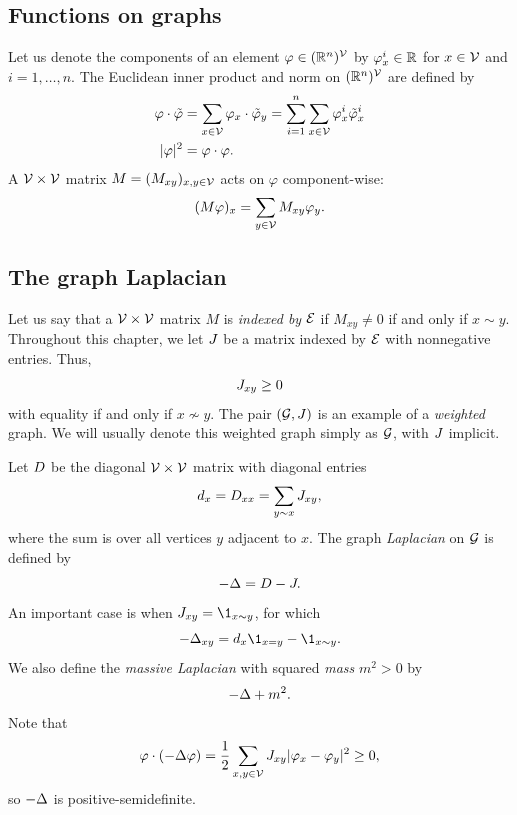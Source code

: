 \subsection{Functions on graphs}

Let us denote the components of an element $\varphi \in ({\mathbb R}^n)^{\mathcal{V}}$ by
$\varphi^i_x \in {\mathbb R}$ for $x \in \mathcal{V}$ and $i = 1, \ldots, n$.
The Euclidean inner product and norm on $({\mathbb R}^n)^{\mathcal{V}}$
are defined by
\begin{align}
\varphi\cdot\tilde\varphi
	&= \sum_{x\in\mathcal{V}} \varphi_x \cdot \tilde\varphi_y
  		= \sum_{i=1}^n \sum_{x\in\mathcal{V}} \varphi^i_x \tilde\varphi^i_x \\
|\varphi|^2
	&= \varphi \cdot \varphi.
\end{align}
A $\mathcal{V}\times\mathcal{V}$ matrix $M = (M_{xy})_{x,y\in\mathcal{V}}$ acts on $\varphi$
component-wise:
\begin{equation}
(M \varphi)_x = \sum_{y\in\mathcal{V}} M_{xy} \varphi_y.
\end{equation}


\subsection{The graph Laplacian}

Let us say that a $\mathcal{V}\times\mathcal{V}$ matrix $M$ is \emph{indexed by} $\mathcal{E}$
if $M_{xy} \ne 0$ if and only if $x \sim y$.
Throughout this chapter, we let $J$ be a matrix indexed by $\mathcal{E}$ with nonnegative entries.
Thus,
\begin{equation}
J_{xy} \ge 0
\end{equation}
with equality if and only if $x \not\sim y$.
The pair $(\mathcal{G}, J)$ is an example of a \emph{weighted} graph.
We will usually denote this weighted graph simply as $\mathcal{G}$, with $J$
implicit.

Let $D$ be the diagonal $\mathcal{V}\times\mathcal{V}$ matrix with diagonal entries
\begin{equation}
d_x = D_{xx} = \sum_{y \sim x} J_{xy},
\end{equation}
where the sum is over all vertices $y$ adjacent to $x$.
The graph \emph{Laplacian} on $\mathcal{G}$ is defined by
\begin{equation}
-\Delta = D - J.
\end{equation}
An important case is when $\jay_{xy} = \1_{x\sim y}$, for which
\begin{equation}
\label{e:Deltaxy}
-\Delta_{xy} = d_x \1_{x=y} - \1_{x \sim y}.
\end{equation}
We also define the \emph{massive Laplacian} with squared \emph{mass} $m^2 > 0$ by
\begin{equation}
-\Delta + m^2.
\end{equation}
Note that
\begin{equation}
\label{e:sbp-gen}
\varphi \cdot (-\Delta \varphi)
  =
\frac{1}{2} \sum_{x,y\in\mathcal{V}} J_{xy} |\varphi_x - \varphi_y|^2
  \ge
0,
\end{equation}
so $-\Delta$ is positive-semidefinite.

